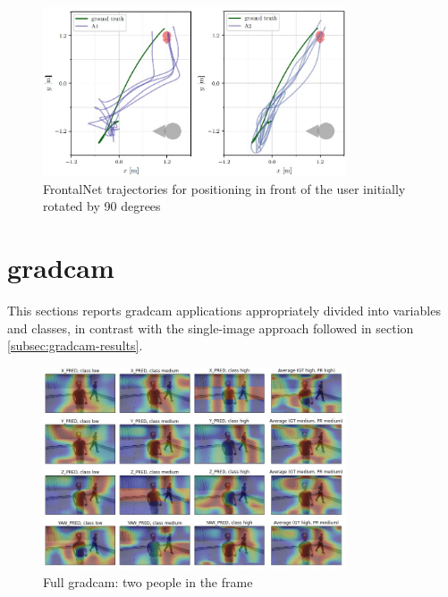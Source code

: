 \begin{figure}[!htb]
	\centering
	\includegraphics[width=0.8\textwidth]{"contents/images/03-frontalnet-trajectories"}
	\caption[FrontalNet trajectories for positioning in front of the user initially rotated by 90 degrees \cite{mantegazza2019visionbased}]{FrontalNet trajectories for positioning in front of the user initially rotated by 90 degrees \cite{mantegazza2019visionbased}}
	\label{fig:frontalnet-trajectories}
\end{figure}

\clearpage


\section{\gls{gradcam}}
\label{sec:extra-gradcam}

This sections reports \gls{gradcam} applications appropriately divided into variables and classes, in contrast with the single-image approach followed in section \ref{subsec:gradcam-results}.

\begin{figure}[!h]
	\centering
	\includegraphics[width=0.8\textwidth]{"contents/images/gradcam/apx-gradcam-1"}
	\caption[Full \gls{gradcam}: two people in the frame]{Full \gls{gradcam}: two people in the frame}
	\label{fig:apx-gradcam-1}
\end{figure}

